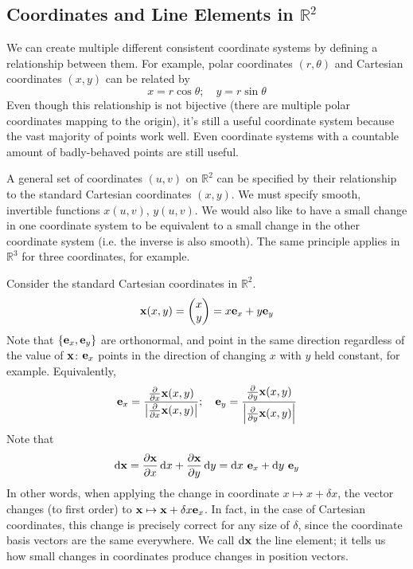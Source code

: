 \documentclass{article}
\begin{document}
\subsection{Coordinates and Line Elements in $\mathbb R^2$}
We can create multiple different consistent coordinate systems by defining a relationship between them. For example, polar coordinates $(r, \theta)$ and Cartesian coordinates $(x, y)$ can be related by
\[ x = r \cos \theta;\quad y = r \sin \theta \]
Even though this relationship is not bijective (there are multiple polar coordinates mapping to the origin), it's still a useful coordinate system because the vast majority of points work well. Even coordinate systems with a countable amount of badly-behaved points are still useful.

A general set of coordinates $(u, v)$ on $\mathbb R^2$ can be specified by their relationship to the standard Cartesian coordinates $(x, y)$. We must specify smooth, invertible functions $x(u, v)$, $y(u, v)$. We would also like to have a small change in one coordinate system to be equivalent to a small change in the other coordinate system (i.e. the inverse is also smooth). The same principle applies in $\mathbb R^3$ for three coordinates, for example.

Consider the standard Cartesian coordinates in $\mathbb R^2$.
\[ \vb x(x, y) = \begin{pmatrix}
        x \\ y
    \end{pmatrix} = x \vb e_x + y \vb e_y \]
Note that $\{\vb e_x, \vb e_y\}$ are orthonormal, and point in the same direction regardless of the value of $\vb x$: $\vb e_x$ points in the direction of changing $x$ with $y$ held constant, for example. Equivalently,
\[ \vb e_x = \frac{\frac{\partial}{\partial x} \vb x(x, y)}{\abs{\frac{\partial}{\partial x} \vb x(x, y)}};\quad \vb e_y = \frac{\frac{\partial}{\partial y} \vb x(x, y)}{\abs{\frac{\partial}{\partial y} \vb x(x, y)}} \]
Note that
\[ \dd \vb x = \frac{\partial \vb x}{\partial x}\dd{x} + \frac{\partial \vb x}{\partial y} \dd{y} = \dd{x} \,\vb e_x + \dd{y} \,\vb e_y \]
In other words, when applying the change in coordinate $x \mapsto x + \delta x$, the vector changes (to first order) to $\vb x \mapsto \vb x + \delta x \vb e_x$. In fact, in the case of Cartesian coordinates, this change is precisely correct for any size of $\delta$, since the coordinate basis vectors are the same everywhere. We call $\dd \vb x$ the line element; it tells us how small changes in coordinates produce changes in position vectors.
\end{document}
